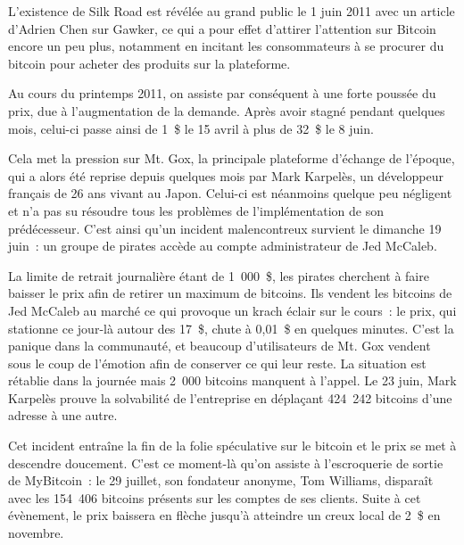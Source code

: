 L'existence de Silk Road est révélée au grand public le 1\ier{} juin 2011 avec un article d'Adrien Chen sur Gawker, ce qui a pour effet d'attirer l'attention sur Bitcoin encore un peu plus, notamment en incitant les consommateurs à se procurer du bitcoin pour acheter des produits sur la plateforme. %


Au cours du printemps 2011, on assiste par conséquent à une forte poussée du prix, due à l'augmentation de la demande. Après avoir stagné pendant quelques mois, celui-ci passe ainsi de 1~\$ le 15 avril à plus de 32~\$ le 8 juin.


Cela met la pression sur Mt. Gox, la principale plateforme d'échange de l'époque, qui a alors été reprise depuis quelques mois par Mark Karpelès, un développeur français de 26 ans vivant au Japon. Celui-ci est néanmoins quelque peu négligent et n'a pas su résoudre tous les problèmes de l'implémentation de son prédécesseur. C'est ainsi qu'un incident malencontreux survient le dimanche 19 juin~: un groupe de pirates accède au compte administrateur de Jed McCaleb.

La limite de retrait journalière étant de 1~000~\$, les pirates cherchent à faire baisser le prix afin de retirer un maximum de bitcoins. Ils vendent les bitcoins de Jed McCaleb au marché ce qui provoque un krach éclair sur le cours~: le prix, qui stationne ce jour-là autour des 17~\$, chute à 0,01~\$ en quelques minutes. C'est la panique dans la communauté, et beaucoup d'utilisateurs de Mt. Gox vendent sous le coup de l'émotion afin de conserver ce qui leur reste. La situation est rétablie dans la journée mais 2~000 bitcoins manquent à l'appel. Le 23 juin, Mark Karpelès prouve la solvabilité de l'entreprise en déplaçant 424~242 bitcoins d'une adresse à une autre.

Cet incident entraîne la fin de la folie spéculative sur le bitcoin et le prix se met à descendre doucement. C'est ce moment-là qu'on assiste à l'escroquerie de sortie de MyBitcoin~: le 29 juillet, son fondateur anonyme, Tom Williams, disparaît avec les 154~406 bitcoins présents sur les comptes de ses clients. Suite à cet évènement, le prix baissera en flèche jusqu'à atteindre un creux local de 2~\$ en novembre.


